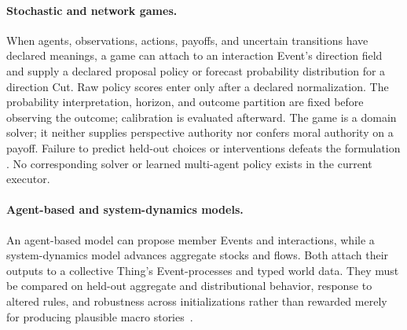 \documentclass[10pt]{article}
\begin{document}
\paragraph{Stochastic and network games.}
When agents, observations, actions, payoffs, and uncertain transitions have
declared meanings, a game can attach to an interaction Event's direction field
and supply a declared proposal policy or forecast probability distribution for
a direction Cut. Raw policy scores enter only after a declared normalization.
The probability interpretation, horizon, and outcome partition are fixed
before observing the outcome; calibration is evaluated afterward. The game is a domain solver; it neither supplies perspective authority nor confers moral authority on a
payoff. Failure to predict held-out choices or
interventions defeats the formulation
\cite{shapley1953stochastic,hansen2004posg,kearns2001graphical}. No corresponding
solver or learned multi-agent policy exists in the current executor.

\paragraph{Agent-based and system-dynamics models.}
An agent-based model can propose member Events and interactions, while a
system-dynamics model advances aggregate stocks and flows. Both attach their
outputs to a collective Thing's Event-processes and typed world data. They must be compared on held-out aggregate and
distributional behavior, response to altered rules, and robustness across
initializations rather than rewarded merely for producing plausible macro
stories~\cite{epsteinAxtell1996artificialSocieties,
forrester1961industrialDynamics}.
\end{document}
